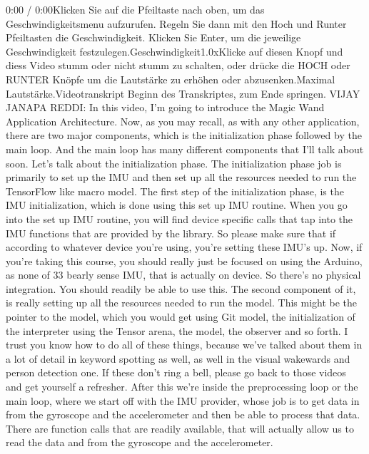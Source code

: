     0:00 / 0:00Klicken Sie auf die Pfeiltaste nach oben, um das Geschwindigkeitsmenu aufzurufen. Regeln Sie dann mit den Hoch und Runter Pfeiltasten die Geschwindigkeit. Klicken Sie Enter, um die jeweilige Geschwindigkeit festzulegen.Geschwindigkeit1.0xKlicke auf diesen Knopf und diess Video stumm oder nicht stumm zu schalten, oder drücke die HOCH oder RUNTER Knöpfe um die Lautstärke zu erhöhen oder abzusenken.Maximal Lautstärke.Videotranskript
    Beginn des Transkriptes, zum Ende springen.
    VIJAY JANAPA REDDI: In this video, I'm going to introduce the Magic Wand
    Application Architecture.
    Now, as you may recall, as with any other application,
    there are two major components, which is the initialization
    phase followed by the main loop.
    And the main loop has many different components that I'll talk about soon.
    Let's talk about the initialization phase.
    The initialization phase job is primarily to set up the IMU
    and then set up all the resources needed to run the TensorFlow like macro model.
    The first step of the initialization phase,
    is the IMU initialization, which is done using this set up IMU routine.
    When you go into the set up IMU routine, you
    will find device specific calls that tap into the IMU functions that
    are provided by the library.
    So please make sure that if according to whatever device you're using,
    you're setting these IMU's up.
    Now, if you're taking this course, you should really just
    be focused on using the Arduino, as none of 33 bearly sense
    IMU, that is actually on device.
    So there's no physical integration.
    You should readily be able to use this.
    The second component of it, is really setting up all the resources
    needed to run the model.
    This might be the pointer to the model, which
    you would get using Git model, the initialization of the interpreter using
    the Tensor arena, the model, the observer and so forth.
    I trust you know how to do all of these things,
    because we've talked about them in a lot of detail in keyword spotting as well,
    as well in the visual wakewards and person detection one.
    If these don't ring a bell, please go back to those videos
    and get yourself a refresher.
    After this we're inside the preprocessing loop or the main loop,
    where we start off with the IMU provider, whose job is
    to get data in from the gyroscope and the accelerometer
    and then be able to process that data.
    There are function calls that are readily available,
    that will actually allow us to read the data
    and from the gyroscope and the accelerometer.
